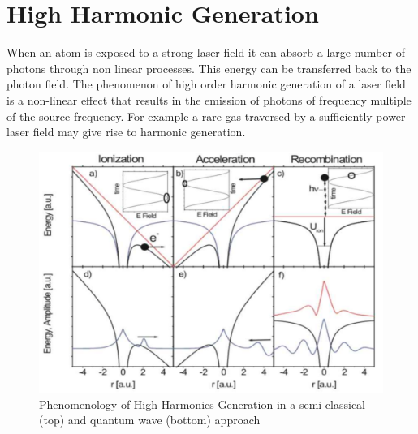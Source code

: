 \section{High Harmonic Generation}
When an atom is exposed to a strong laser field it can absorb a large number of photons through non linear processes. This energy can be transferred back to the photon field.
The phenomenon of high order harmonic generation of a laser field is a non-linear effect that results in the emission of photons of frequency multiple of the source frequency. For example a rare gas traversed by a sufficiently power laser field may give rise to harmonic generation.
\begin{figure}[htbp]
\begin{center}
\includegraphics[width=12cm]{../Pictures/Chapter_7/HHG}
\end{center}
\caption[HHG phenomenology]{Phenomenology of High Harmonics Generation in a semi-classical (top) and quantum wave (bottom) approach}
\label{fig:HHG}
\end{figure}

